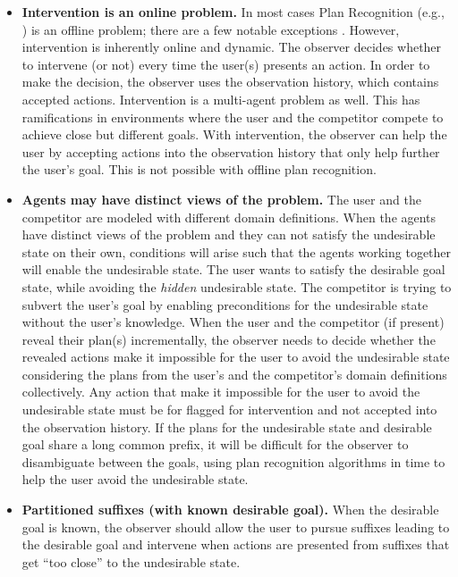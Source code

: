 \begin{itemize}
\item \textbf{Intervention is an online problem.}
In most cases Plan Recognition (e.g., \cite{ramirez2009plan,ramirez2010probabilistic, sohrabi2016plan}) is an offline problem;
there are a few notable exceptions \cite{mirsky2018}.
However, intervention is inherently online and dynamic.  
The observer decides whether to intervene (or not) every time the user(s) presents an action.
In order to make the decision, the observer uses the observation history, which contains accepted actions.
Intervention is a multi-agent problem as well. 
This has ramifications in environments where the user and the competitor compete to achieve close but different goals. 
With intervention, the observer can help the user by accepting actions into the observation history that only help further the user's goal. 
This is not possible with offline plan recognition.
\item \textbf{Agents may have distinct views of the problem.}  
The user and the competitor are modeled with different domain definitions. 
When the agents have distinct views of the problem and they can not satisfy the undesirable state on their own, conditions will arise such that the agents working together will enable the undesirable state.
The user wants to satisfy the desirable goal state, while avoiding the \textit{hidden} undesirable state.
The competitor is trying to subvert the user’s goal by enabling preconditions for the undesirable state without the user's knowledge.
When the user and the competitor (if present) reveal their plan(s) incrementally, the observer needs to decide whether the revealed actions make it impossible for the user to avoid the undesirable state considering the plans from the user's and the competitor's domain definitions collectively. 
Any action that make it impossible for the user to avoid the undesirable state must be for flagged for intervention and not accepted into the observation history.
If the plans for the undesirable state and desirable goal share a long common prefix, 
it will be difficult for the observer to disambiguate between the goals, using plan recognition algorithms in time to help the user avoid the undesirable state.
\item \textbf{Partitioned suffixes (with known desirable goal).}
When the desirable goal is known, the observer should allow the user to pursue suffixes leading to the desirable goal and intervene when actions are presented from suffixes that get ``too close'' to the undesirable state. 

\end{itemize}
